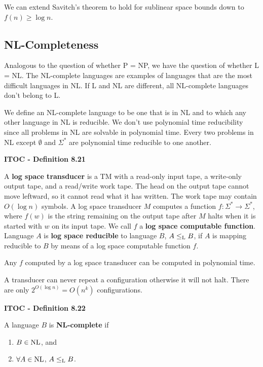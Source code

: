 We can extend Savitch's theorem to hold for sublinear space bounds down to $f(n) \geq \log n$.

\subsection{NL-Completeness}

Analogous to the question of whether P = NP, we have the question of whether L = NL. The NL-complete languages are examples of languages that are  the most difficult languages in NL. If L and NL are different, all NL-complete languages don't belong to L.

We define an NL-complete language to be one that is in NL and to which any other language in NL is reducible. We don't use polynomial time reducibility since all problems in NL are solvable in polynomial time. Every two problems in NL except $\emptyset$ and $\Sigma^*$ are polynomial time reducible to one another.

\begin{shaded}
\textbf{ITOC - Definition 8.21}

\medskip
A \textbf{log space transducer} is a TM with a read-only input tape, a write-only output tape, and a read/write work tape. The head on the output tape cannot move leftward, so it cannot read what it has written. The work tape may contain $O(\log n)$ symbols. A log space transducer $M$ computes a function $f:\Sigma^* \rightarrow \Sigma^*$, where $f(w)$ is the string remaining on the output tape after $M$ halts when it is started with $w$ on its input tape. We call $f$ a \textbf{log space computable function}. Language $A$ is \textbf{log space reducible} to language $B$, $A \leq_{\text{L}} B$, if $A$ is mapping reducible to $B$ by means of a log space computable function $f$.
\end{shaded}

Any $f$ computed by a log space transducer can be computed in polynomial time.

A transducer can never repeat a configuration otherwise it will not halt. There are only $2^{O(\log n)}  = O(n^k)$ configurations.

\label{def:8.22}
\begin{shaded}
\textbf{ITOC - Definition 8.22}

\medskip
A language $B$ is \textbf{NL-complete} if
\begin{enumerate}
\item $B\in \text{NL}$, and
\item $\forall A \in \text{NL}$, $A \leq_{\text{L}} B$.
\end{enumerate}
\end{shaded}


